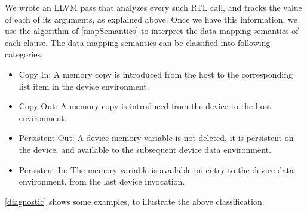 We wrote an LLVM pass that analyzes every such RTL call, and tracks the 
value of each of its arguments, as explained above. Once we have this information, 
we use the algorithm of \autoref{mapSemantics} to interpret the data mapping semantics of each clause.
The data mapping semantics can be classified into following categories, 
\begin{itemize} \vspace{-5pt}
 \item Copy In: A memory copy is introduced from the host to the 
 corresponding list item in the device environment.
 \item Copy Out: A memory copy is introduced from the device to the host environment.
 \item Persistent Out: A device memory variable is not deleted, it is persistent on the device, 
 and available to the subsequent device data environment.
 \item Persistent In: The memory variable is available on entry to the device data environment, 
 from the last device invocation.
\end{itemize}
\autoref{diagnostic} shows some examples, to illustrate the above
classification.

